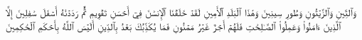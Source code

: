 وَٱلتِّينِ وَٱلزَّيۡتُونِ
وَطُورِ سِينِينَ
وَهَٰذَا ٱلۡبَلَدِ ٱلۡأَمِينِ
لَقَدۡ خَلَقۡنَا ٱلۡإِنسَٰنَ فِيٓ أَحۡسَنِ تَقۡوِيمٖ
ثُمَّ رَدَدۡنَٰهُ أَسۡفَلَ سَٰفِلِينَ
إِلَّا ٱلَّذِينَ ءَامَنُواْ وَعَمِلُواْ ٱلصَّـٰلِحَٰتِ فَلَهُمۡ أَجۡرٌ غَيۡرُ مَمۡنُونٖ
فَمَا يُكَذِّبُكَ بَعۡدُ بِٱلدِّينِ
أَلَيۡسَ ٱللَّهُ بِأَحۡكَمِ ٱلۡحَٰكِمِينَ